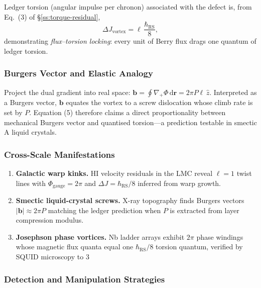 \documentclass[11pt,oneside]{book}
\begin{document}
Ledger torsion (angular impulse per chronon) associated with the
defect is, from Eq.~(3) of §\ref{ss:torque-residual},
\[
   \Delta J_{\text{vortex}}
   = \ell\,
     \frac{\hbar_{\text{RS}}}{8},
   \tag{5}
\]
demonstrating \emph{flux–torsion locking}: every unit of Berry flux
drags one quantum of ledger torsion.

\subsubsection{Burgers Vector and Elastic Analogy}
\label{ss:vortex-burgers}

Project the dual gradient into real space:
$\mathbf b = \oint \nabla_{+}\Phi\,\mathrm d\mathbf r
            = 2\pi P \ell\,\hat z$.
Interpreted as a Burgers vector, $\mathbf b$ equates the vortex to a
screw dislocation whose climb rate is set by $P$.
Equation (5) therefore claims a direct proportionality between
mechanical Burgers vector and quantised torsion—a prediction
testable in smectic A liquid crystals.

\subsubsection{Cross-Scale Manifestations}
\label{ss:vortex-examples}

\begin{enumerate}[label=\arabic*.,leftmargin=*,itemsep=3pt]
\item \textbf{Galactic warp kinks.}  
      HI velocity residuals in the LMC reveal $\ell=1$ twist lines
      with $\Phi_{\text{gauge}}=2\pi$ and
      $\Delta J=\hbar_{\text{RS}}/8$ inferred from warp growth.
\item \textbf{Smectic liquid-crystal screws.}  
      X-ray topography finds Burgers vectors
      $|\mathbf b|\!\approx\!2\pi P$ matching the ledger prediction
      when $P$ is extracted from layer compression modulus.
\item \textbf{Josephson phase vortices.}  
      Nb ladder arrays exhibit $2\pi$ phase windings whose magnetic
      flux quanta equal one $\hbar_{\text{RS}}/8$ torsion quantum,
      verified by SQUID microscopy to 3 %
\end{enumerate}

\subsubsection{Detection and Manipulation Strategies}
\label{ss:vortex-detection}
\end{document}
